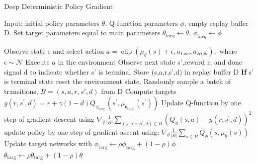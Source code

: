 \begin{algorithm}
	\caption{Deep Deterministic Policy Gradient}
	\label{algo:DDPG}
	\begin{algorithmic}[]
		\State Input: initial policy parameters $\theta$, Q-function parameters $\phi$, empty replay buffer {D}. 
		\State Set target parameters equal to main parameters $\theta_{targ} \leftarrow \theta $, $\phi_{targ} \leftarrow \phi $  
          
			\State Observe state s and select action $a=\operatorname{clip}\left(\mu_{\theta}(s)+\epsilon, a_{L o w}, a_{H i g h}\right),$ where $\epsilon \sim \mathcal{N}$
            \State Execute $a$ in the environment
            \State Observe next state {s'},reward {r}, and done signal {d} to indicate whether {s'} is terminal 
            \State Store (s,a,r,s',d) in replay buffer D
            \State \textbf{If} s' is terminal state reset the environment state.
                	\State Randomly sample a batch of transitions, $B={(s,a,r,s',d)}$ from D
                    \State Compute targets
                    \State $y\left(r, s^{\prime}, d\right)=r+\gamma(1-d) Q_{\phi_{\text {targ }}}\left(s^{\prime}, \mu_{\theta_{\text {targ }}}\left(s^{\prime}\right)\right)$
                    \State Update Q-function by one step of gradient descent using
                     \State $\nabla_{\phi} \frac{1}{|B|} \sum_{\left(s, a, r, s^{\prime}, d\right) \in B}\left(Q_{\phi}(s, a)-y\left(r, s^{\prime}, d\right)\right)^{2}$
                    \State update policy by one step of gradient ascent using:
                    \State $\nabla_{\theta} \frac{1}{|B|} \sum_{s \in B} Q_{\phi}\left(s, \mu_{\theta}(s)\right)$
                    \State Update target networks with
                    \State $\phi_{\mathrm{targ}} \leftarrow \rho \phi_{\mathrm{targ}}+(1-\rho) \phi$
					\State $\theta_{\mathrm{targ}} \leftarrow \rho \theta_{\mathrm{targ}}+(1-\rho) \theta$
                    	
                \EndFor
            \EndIf       
      \EndFor                         
	\end{algorithmic}
\end{algorithm}



